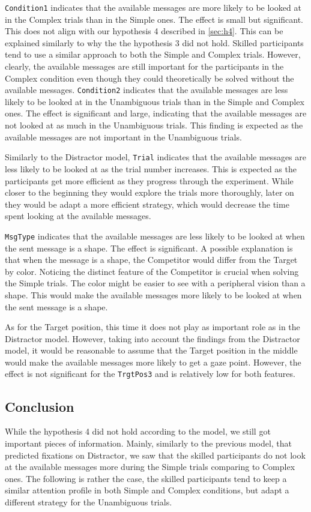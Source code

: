\texttt{Condition1} indicates that the available messages are more likely to be looked at in the Complex trials than in the Simple ones. The effect is small but significant. This does not align with our hypothesis 4 described in \autoref{sec:h4}. This can be explained similarly to why the the hypothesis 3 did not hold. Skilled participants tend to use a similar approach to both the Simple and Complex trials. However, clearly, the available messages are still important for the participants in the Complex condition even though they could theoretically be solved without the available messages. \texttt{Condition2} indicates that the available messages are less likely to be looked at in the Unambiguous trials than in the Simple and Complex ones. The effect is significant and large, indicating that the available messages are not looked at as much in the Unambiguous trials. This finding is expected as the available messages are not important in the Unambiguous trials.

Similarly to the Distractor model, \texttt{Trial} indicates that the available messages are less likely to be looked at as the trial number increases. This is expected as the participants get more efficient as they progress through the experiment. While closer to the beginning they would explore the trials more thoroughly, later on they would be adapt a more efficient strategy, which would decrease the time spent looking at the available messages.

\texttt{MsgType} indicates that the available messages are less likely to be looked at when the sent message is a shape. The effect is significant. A possible explanation is that when the message is a shape, the Competitor would differ from the Target by color. Noticing the distinct feature of the Competitor is crucial when solving the Simple trials. The color might be easier to see with a peripheral vision than a shape. This would make the available messages more likely to be looked at when the sent message is a shape.

As for the Target position, this time it does not play as important role as in the Distractor model. However, taking into account the findings from the Distractor model, it would be reasonable to assume that the Target position in the middle would make the available messages more likely to get a gaze point. However, the effect is not significant for the \texttt{TrgtPos3} and is relatively low for both features. 

\subsection*{Conclusion}
\label{sec:avmsgs_conclusion}
While the hypothesis 4 did not hold according to the model, we still got important pieces of information. Mainly, similarly to the previous model, that predicted fixations on Distractor, we saw that the skilled participants do not look at the available messages more during the Simple trials comparing to Complex ones. The following is rather the case, the skilled participants tend to keep a similar attention profile in both Simple and Complex conditions, but adapt a different strategy for the Unambiguous trials. 






